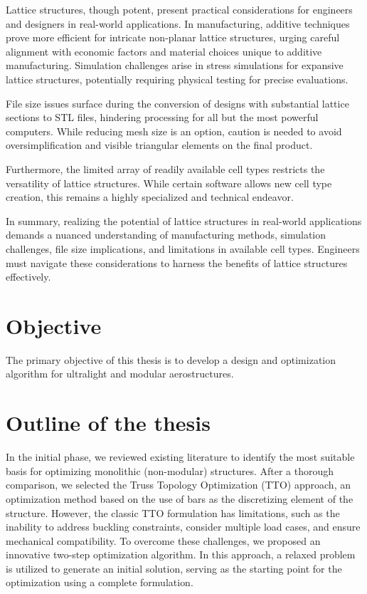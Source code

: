 Lattice structures, though potent, present practical considerations for engineers and designers in real-world applications. In manufacturing, additive techniques prove more efficient for intricate non-planar lattice structures, urging careful alignment with economic factors and material choices unique to additive manufacturing. Simulation challenges arise in stress simulations for expansive lattice structures, potentially requiring physical testing for precise evaluations.

File size issues surface during the conversion of designs with substantial lattice sections to STL files, hindering processing for all but the most powerful computers. While reducing mesh size is an option, caution is needed to avoid oversimplification and visible triangular elements on the final product.

Furthermore, the limited array of readily available cell types restricts the versatility of lattice structures. While certain software allows new cell type creation, this remains a highly specialized and technical endeavor.

In summary, realizing the potential of lattice structures in real-world applications demands a nuanced understanding of manufacturing methods, simulation challenges, file size implications, and limitations in available cell types. Engineers must navigate these considerations to harness the benefits of lattice structures effectively.



\section*{Objective}
The primary objective of this thesis is to develop a design and optimization algorithm for ultralight and modular aerostructures. 

\section*{Outline of the thesis}
In the initial phase, we reviewed existing literature to identify the most suitable basis for optimizing monolithic (non-modular) structures. After a thorough comparison, we selected the Truss Topology Optimization (TTO) approach, an optimization method based on the use of bars as the discretizing element of the structure. However, the classic TTO formulation has limitations, such as the inability to address buckling constraints, consider multiple load cases, and ensure mechanical compatibility. To overcome these challenges, we proposed an innovative two-step optimization algorithm. In this approach, a relaxed problem is utilized to generate an initial solution, serving as the starting point for the optimization using a complete formulation.

